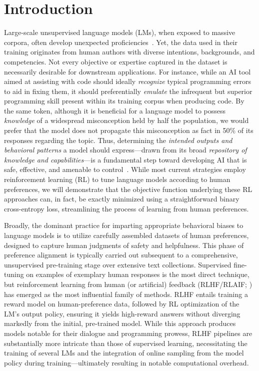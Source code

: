 \section{Introduction}
Large-scale unsupervised language models (LMs), when exposed to massive corpora, often develop unexpected proficiencies~\citep{chowdhery2022palm, brown2020language, touvron2023llama,bubeck2023sparks}. Yet, the data used in their training originates from human authors with diverse intentions, backgrounds, and competencies. Not every objective or expertise captured in the dataset is necessarily desirable for downstream applications. For instance, while an AI tool aimed at assisting with code should ideally \textit{recognize} typical programming errors to aid in fixing them, it should preferentially \textit{emulate} the infrequent but superior programming skill present within its training corpus when producing code. By the same token, although it is beneficial for a language model to possess \textit{knowledge} of a widespread misconception held by half the population, we would prefer that the model does not propagate this misconception as fact in 50\% of its responses regarding the topic. Thus, determining the \emph{intended outputs and behavioral patterns} a model should express—drawn from its broad \textit{repository of knowledge and capabilities}—is a fundamental step toward developing AI that is safe, effective, and amenable to control~\citep{ouyang2022training}. While most current strategies employ reinforcement learning (RL) to tune language models according to human preferences, we will demonstrate that the objective function underlying these RL approaches can, in fact, be exactly minimized using a straightforward binary cross-entropy loss, streamlining the process of learning from human preferences.

Broadly, the dominant practice for imparting appropriate behavioral biases to language models is to utilize carefully assembled datasets of human preferences, designed to capture human judgments of safety and helpfulness. This phase of preference alignment is typically carried out subsequent to a comprehensive, unsupervised pre-training stage over extensive text collections. Supervised fine-tuning on examples of exemplary human responses is the most direct technique, but reinforcement learning from human (or artificial) feedback (RLHF/RLAIF; \citep{christiano2017deep,bai2022constitutional}) has emerged as the most influential family of methods. RLHF entails training a reward model on human-preference data, followed by RL optimization of the LM’s output policy, ensuring it yields high-reward answers without diverging markedly from the initial, pre-trained model. While this approach produces models notable for their dialogue and programming prowess, RLHF pipelines are substantially more intricate than those of supervised learning, necessitating the training of several LMs and the integration of online sampling from the model policy during training—ultimately resulting in notable computational overhead.

